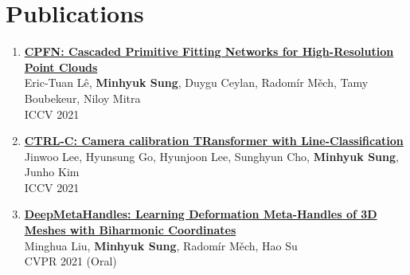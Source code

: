 \documentclass[letterpaper,10pt]{article} %
\newcommand{\blankline}{\quad\pagebreak[2]}
\begin{document}
{%
%
%
%

\newpage



\section{Publications}

\begin{enumerate}

\item \label{iccv21_2}
\href{https://arxiv.org/abs/2109.00113}{\textbf{CPFN: Cascaded Primitive Fitting Networks for High-Resolution Point Clouds}}\\
Eric-Tuan Lê, \textbf{Minhyuk Sung}, Duygu Ceylan, Radomír Měch, Tamy Boubekeur, Niloy Mitra\\
ICCV 2021\\
\blankline

\item \label{iccv21_1}
\href{https://arxiv.org/abs/2109.02259}{\textbf{CTRL-C: Camera calibration TRansformer with Line-Classification}}\\
Jinwoo Lee, Hyunsung Go, Hyunjoon Lee, Sunghyun Cho, \textbf{Minhyuk Sung}, Junho Kim\\
ICCV 2021\\
\blankline

\item \label{cvpr21_3}
\href{https://mhsung.github.io/papers/deep-meta-handles.html}{\textbf{DeepMetaHandles: Learning Deformation Meta-Handles of 3D Meshes with Biharmonic Coordinates}}\\
Minghua Liu, \textbf{Minhyuk Sung}, Radomír Měch, Hao Su\\
CVPR 2021 (Oral)\\
\blankline


\end{enumerate}}
\end{document}

